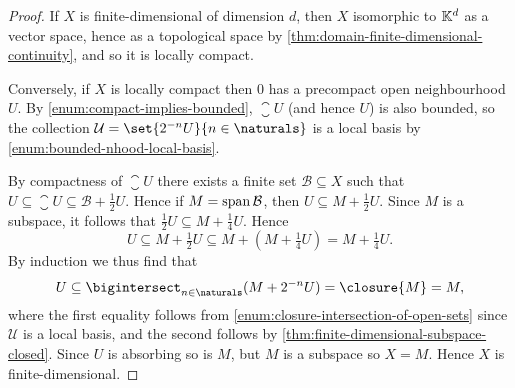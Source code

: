 \documentclass[article, a4paper, 11pt, oneside]{memoir}
\numberwithin{equation}{chapter}
\newcommand{\calB}{\mathcal{B}}
\newcommand{\calU}{\mathcal{U}}
\begin{document}
\begin{proof}
    If $X$ is finite-dimensional of dimension $d$, then $X$ isomorphic to $\mathbb{K}^d$ as a vector space, hence as a topological space by \cref{thm:domain-finite-dimensional-continuity}, and so it is locally compact.

    Conversely, if $X$ is locally compact then $0$ has a precompact open neighbourhood $U$. By \cref{enum:compact-implies-bounded}, $\closure{U}$ (and hence $U$) is also bounded, so the collection $\calU = \set{2^{-n}U}{n \in \naturals}$ is a local basis by \cref{enum:bounded-nhood-local-basis}.

    By compactness of $\closure{U}$ there exists a finite set $\calB \subseteq X$ such that $U \subseteq \closure{U} \subseteq \calB + \frac{1}{2} U$. Hence if $M = \Span\calB$, then $U \subseteq M + \frac{1}{2} U$. Since $M$ is a subspace, it follows that $\frac{1}{2} U \subseteq M + \frac{1}{4} U$. Hence
    \begin{equation*}
        U
            \subseteq M + \tfrac{1}{2} U
            \subseteq M + (M + \tfrac{1}{4} U)
            = M + \tfrac{1}{4} U.
    \end{equation*}
    By induction we thus find that
    \begin{equation*}
        U
            \subseteq \bigintersect_{n \in \naturals} (M + 2^{-n}U)
            = \closure{M}
            = M,
    \end{equation*}
    where the first equality follows from \cref{enum:closure-intersection-of-open-sets} since $\calU$ is a local basis, and the second follows by \cref{thm:finite-dimensional-subspace-closed}.  Since $U$ is absorbing so is $M$, but $M$ is a subspace so $X = M$. Hence $X$ is finite-dimensional.
\end{proof}



\end{document}
